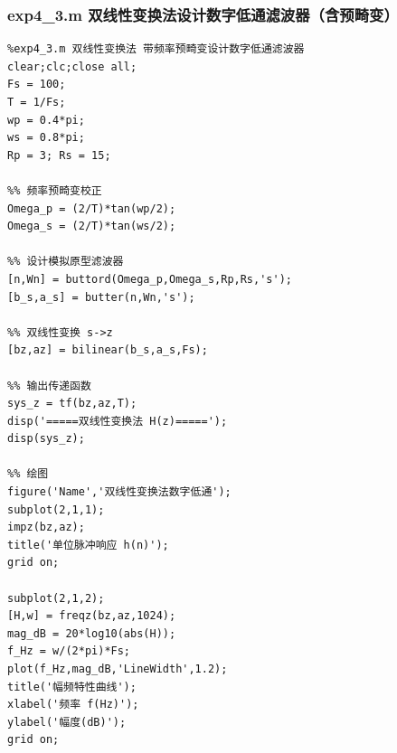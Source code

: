 \subsubsection{exp4\_3.m 双线性变换法设计数字低通滤波器（含预畸变）}
\begin{lstlisting}
%exp4_3.m 双线性变换法 带频率预畸变设计数字低通滤波器
clear;clc;close all;
Fs = 100;
T = 1/Fs;
wp = 0.4*pi;
ws = 0.8*pi;
Rp = 3; Rs = 15;

%% 频率预畸变校正
Omega_p = (2/T)*tan(wp/2);
Omega_s = (2/T)*tan(ws/2);

%% 设计模拟原型滤波器
[n,Wn] = buttord(Omega_p,Omega_s,Rp,Rs,'s');
[b_s,a_s] = butter(n,Wn,'s');

%% 双线性变换 s->z
[bz,az] = bilinear(b_s,a_s,Fs);

%% 输出传递函数
sys_z = tf(bz,az,T);
disp('=====双线性变换法 H(z)=====');
disp(sys_z);

%% 绘图
figure('Name','双线性变换法数字低通');
subplot(2,1,1);
impz(bz,az);
title('单位脉冲响应 h(n)');
grid on;

subplot(2,1,2);
[H,w] = freqz(bz,az,1024);
mag_dB = 20*log10(abs(H));
f_Hz = w/(2*pi)*Fs;
plot(f_Hz,mag_dB,'LineWidth',1.2);
title('幅频特性曲线');
xlabel('频率 f(Hz)');
ylabel('幅度(dB)');
grid on;
\end{lstlisting}